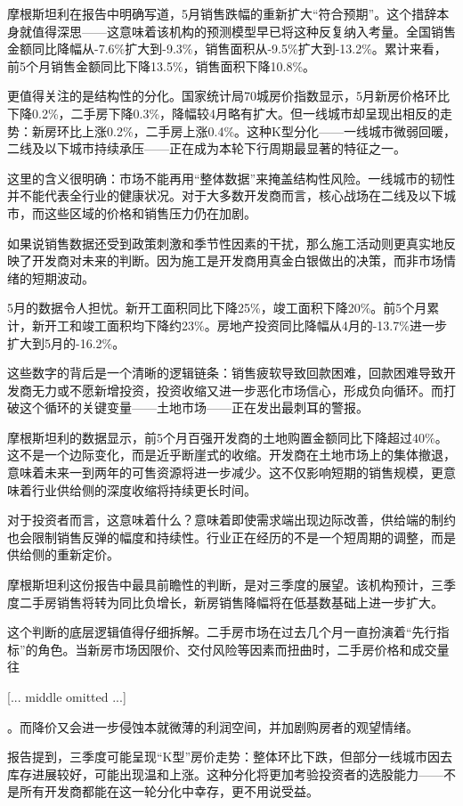 \documentclass[11pt]{ctexart}
\begin{document}
摩根斯坦利在报告中明确写道，5月销售跌幅的重新扩大“符合预期”。这个措辞本身就值得深思——这意味着该机构的预测模型早已将这种反复纳入考量。全国销售金额同比降幅从-7.6\%扩大到-9.3\%，销售面积从-9.5\%扩大到-13.2\%。累计来看，前5个月销售金额同比下降13.5\%，销售面积下降10.8\%。

更值得关注的是结构性的分化。国家统计局70城房价指数显示，5月新房价格环比下降0.2\%，二手房下降0.3\%，降幅较4月略有扩大。但一线城市却呈现出相反的走势：新房环比上涨0.2\%，二手房上涨0.4\%。这种K型分化——一线城市微弱回暖，二线及以下城市持续承压——正在成为本轮下行周期最显著的特征之一。

这里的含义很明确：市场不能再用“整体数据”来掩盖结构性风险。一线城市的韧性并不能代表全行业的健康状况。对于大多数开发商而言，核心战场在二线及以下城市，而这些区域的价格和销售压力仍在加剧。

如果说销售数据还受到政策刺激和季节性因素的干扰，那么施工活动则更真实地反映了开发商对未来的判断。因为施工是开发商用真金白银做出的决策，而非市场情绪的短期波动。

5月的数据令人担忧。新开工面积同比下降25\%，竣工面积下降20\%。前5个月累计，新开工和竣工面积均下降约23\%。房地产投资同比降幅从4月的-13.7\%进一步扩大到5月的-16.2\%。

这些数字的背后是一个清晰的逻辑链条：销售疲软导致回款困难，回款困难导致开发商无力或不愿新增投资，投资收缩又进一步恶化市场信心，形成负向循环。而打破这个循环的关键变量——土地市场——正在发出最刺耳的警报。

摩根斯坦利的数据显示，前5个月百强开发商的土地购置金额同比下降超过40\%。这不是一个边际变化，而是近乎断崖式的收缩。开发商在土地市场上的集体撤退，意味着未来一到两年的可售资源将进一步减少。这不仅影响短期的销售规模，更意味着行业供给侧的深度收缩将持续更长时间。

对于投资者而言，这意味着什么？意味着即使需求端出现边际改善，供给端的制约也会限制销售反弹的幅度和持续性。行业正在经历的不是一个短周期的调整，而是供给侧的重新定价。

摩根斯坦利这份报告中最具前瞻性的判断，是对三季度的展望。该机构预计，三季度二手房销售将转为同比负增长，新房销售降幅将在低基数基础上进一步扩大。

这个判断的底层逻辑值得仔细拆解。二手房市场在过去几个月一直扮演着“先行指标”的角色。当新房市场因限价、交付风险等因素而扭曲时，二手房价格和成交量往

[... middle omitted ...]

。而降价又会进一步侵蚀本就微薄的利润空间，并加剧购房者的观望情绪。

报告提到，三季度可能呈现“K型”房价走势：整体环比下跌，但部分一线城市因去库存进展较好，可能出现温和上涨。这种分化将更加考验投资者的选股能力——不是所有开发商都能在这一轮分化中幸存，更不用说受益。
\end{document}
